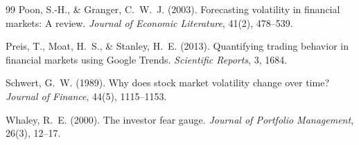 \documentclass[12pt,a4paper]{article}
\begin{document}
\begin{thebibliography}{99}
Poon, S.-H., \& Granger, C.~W.~J. (2003). Forecasting volatility in financial markets: A review. \textit{Journal of Economic Literature}, 41(2), 478--539.

Preis, T., Moat, H.~S., \& Stanley, H.~E. (2013). Quantifying trading behavior in financial markets using Google Trends. \textit{Scientific Reports}, 3, 1684.

Schwert, G.~W. (1989). Why does stock market volatility change over time? \textit{Journal of Finance}, 44(5), 1115--1153.

Whaley, R.~E. (2000). The investor fear gauge. \textit{Journal of Portfolio Management}, 26(3), 12--17.

\end{thebibliography}
\end{document}
